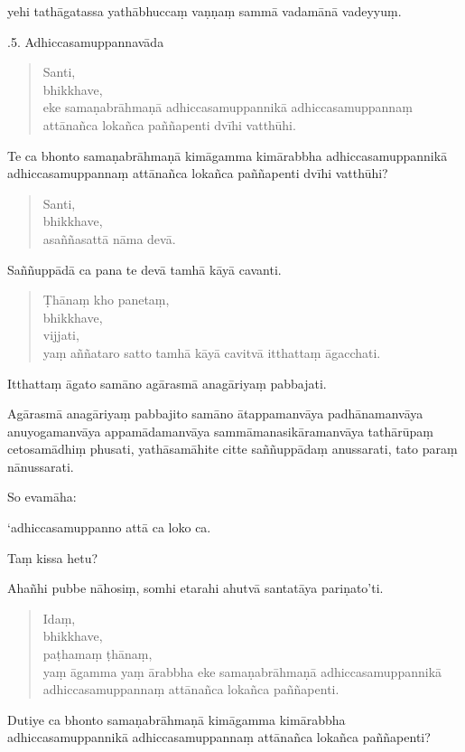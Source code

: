 \documentclass[11pt,twoside,openright]{book}
\begin{document}
\pstart
yehi tathāgatassa yathābhuccaṃ vaṇṇaṃ sammā vadamānā vadeyyuṃ.
\pend

.5. Adhiccasamuppannavāda
\pend

\begin{verse}
Santi,\\
\vin  bhikkhave,\\
\vin  eke samaṇabrāhmaṇā adhiccasamuppannikā adhiccasamuppannaṃ attānañca lokañca paññapenti dvīhi vatthūhi.

\end{verse}
\pstart
Te ca bhonto samaṇabrāhmaṇā kimāgamma kimārabbha adhiccasamuppannikā adhiccasamuppannaṃ attānañca lokañca paññapenti dvīhi vatthūhi?
\pend

\begin{verse}
Santi,\\
\vin  bhikkhave,\\
\vin  asaññasattā nāma devā.

\end{verse}
\pstart
Saññuppādā ca pana te devā tamhā kāyā cavanti.
\pend

\begin{verse}
Ṭhānaṃ kho panetaṃ,\\
\vin  bhikkhave,\\
\vin  vijjati,\\
\vin  yaṃ aññataro satto tamhā kāyā cavitvā itthattaṃ āgacchati.

\end{verse}
\pstart
Itthattaṃ āgato samāno agārasmā anagāriyaṃ pabbajati.
\pend

\pstart
Agārasmā anagāriyaṃ pabbajito samāno ātappamanvāya padhānamanvāya anuyogamanvāya appamādamanvāya sammāmanasikāramanvāya tathārūpaṃ cetosamādhiṃ phusati, yathāsamāhite citte saññuppādaṃ anussarati, tato paraṃ nānussarati.
\pend

\pstart
So evamāha:
\pend

\pstart
‘adhiccasamuppanno attā ca loko ca.
\pend

\pstart
Taṃ kissa hetu?
\pend

\pstart
Ahañhi pubbe nāhosiṃ, somhi etarahi ahutvā santatāya pariṇato’ti.
\pend

\begin{verse}
Idaṃ,\\
\vin  bhikkhave,\\
\vin  paṭhamaṃ ṭhānaṃ,\\
\vin  yaṃ āgamma yaṃ ārabbha eke samaṇabrāhmaṇā adhiccasamuppannikā adhiccasamuppannaṃ attānañca lokañca paññapenti.

\end{verse}
\pstart
Dutiye ca bhonto samaṇabrāhmaṇā kimāgamma kimārabbha adhiccasamuppannikā adhiccasamuppannaṃ attānañca lokañca paññapenti?
\pend
\end{document}
